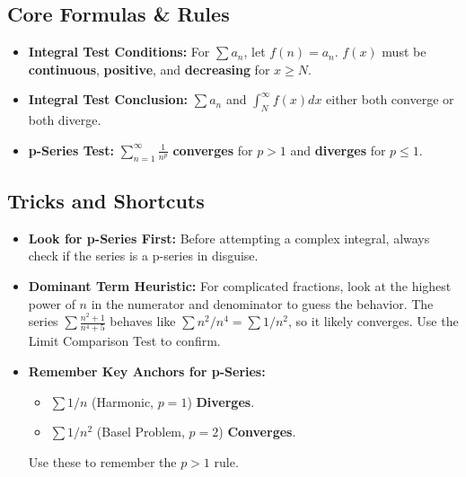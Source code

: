 \documentclass{article}
\begin{document}
\subsection{Core Formulas \& Rules}
\begin{itemize}
    \item \textbf{Integral Test Conditions:} For $\sum a_n$, let $f(n)=a_n$. $f(x)$ must be \textbf{continuous}, \textbf{positive}, and \textbf{decreasing} for $x \ge N$.
    \item \textbf{Integral Test Conclusion:} $\sum a_n$ and $\int_N^\infty f(x) dx$ either both converge or both diverge.
    \item \textbf{p-Series Test:} $\sum_{n=1}^\infty \frac{1}{n^p}$ \textbf{converges} for $p > 1$ and \textbf{diverges} for $p \le 1$.
\end{itemize}

\subsection{Tricks and Shortcuts}
\begin{itemize}
    \item \textbf{Look for p-Series First:} Before attempting a complex integral, always check if the series is a p-series in disguise.
    \item \textbf{Dominant Term Heuristic:} For complicated fractions, look at the highest power of $n$ in the numerator and denominator to guess the behavior. The series $\sum \frac{n^2+1}{n^4+5}$ behaves like $\sum n^2/n^4 = \sum 1/n^2$, so it likely converges. Use the Limit Comparison Test to confirm.
    \item \textbf{Remember Key Anchors for p-Series:}
        \begin{itemize}
            \item $\sum 1/n$ (Harmonic, $p=1$) \textbf{Diverges}.
            \item $\sum 1/n^2$ (Basel Problem, $p=2$) \textbf{Converges}.
        \end{itemize}
        Use these to remember the $p>1$ rule.
\end{itemize}
\end{document}
